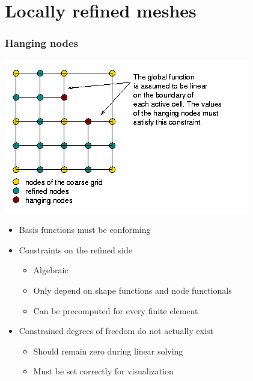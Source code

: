 \section[Local refinement]{Locally refined meshes}

\begin{frame}
  \frametitle{Hanging nodes}
  \begin{center}
    \includegraphics[height=.5\textheight]{graph/hanging_nodes}    
  \end{center}
  \begin{itemize}
  \item Basis functions must be conforming
    \item Constraints on the refined side
    \begin{itemize}
      \item Algebraic
      \item Only depend on shape functions and node functionals
      \item Can be precomputed for every finite element
    \end{itemize}
  \item Constrained degrees of freedom do not actually exist
    \begin{itemize}
    \item Should remain zero during linear solving
    \item Must be set correctly for visualization
    \end{itemize}
  \end{itemize}
\end{frame}

